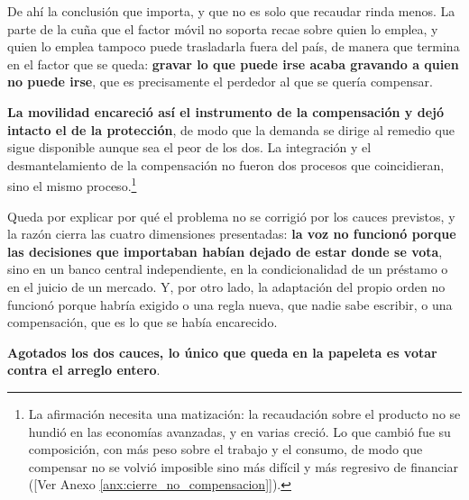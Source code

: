 \documentclass[10pt,a4paper]{article}
\newcommand{\authorfont}[1]{{\fontfamily{EBGaramond-TLF}\selectfont #1}}
\begin{document}
De ahí la conclusión que importa, y que no es solo que recaudar rinda menos. La parte de la cuña que el factor móvil no soporta recae sobre quien lo emplea, y quien lo emplea tampoco puede trasladarla fuera del país, de manera que termina en el factor que se queda: \textbf{gravar lo que puede irse acaba gravando a quien no puede irse}, que es precisamente el perdedor al que se quería compensar.

\textbf{La movilidad encareció así el instrumento de la compensación y dejó intacto el de la protección}, de modo que la demanda se dirige al remedio que sigue disponible aunque sea el peor de los dos. La integración y el desmantelamiento de la compensación no fueron dos procesos que coincidieran, sino el mismo proceso.\footnote{%
    La afirmación necesita una matización: la recaudación sobre el producto no se hundió en las economías avanzadas, y en varias creció. Lo que cambió fue su composición, con más peso sobre el trabajo y el consumo, de modo que compensar no se volvió imposible sino más difícil y más regresivo de financiar ([\authorfont{Ver Anexo \ref{anx:cierre_no_compensacion}}]).
}

Queda por explicar por qué el problema no se corrigió por los cauces previstos, y la razón cierra las cuatro dimensiones presentadas: \textbf{la voz no funcionó porque las decisiones que importaban habían dejado de estar donde se vota}, sino en un banco central independiente, en la condicionalidad de un préstamo o en el juicio de un mercado. Y, por otro lado, la adaptación del propio orden no funcionó porque habría exigido o una regla nueva, que nadie sabe escribir, o una compensación, que es lo que se había encarecido. 

\textbf{Agotados los dos cauces, lo único que queda en la papeleta es votar contra el arreglo entero}.







\clearpage
\end{document}
